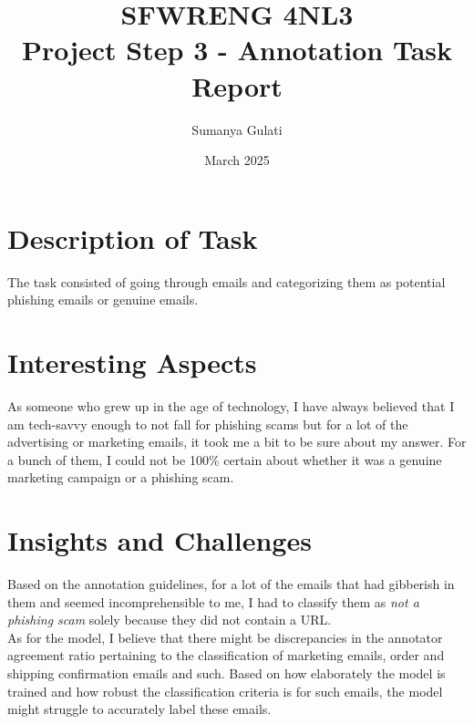 \documentclass[titlepage]{article}
\title{SFWRENG 4NL3\\ Project Step 3 - Annotation Task Report}
\author{Sumanya Gulati}
\date{March 2025}
\begin{document}
\begin{titlepage}
    \maketitle
\end{titlepage}

\newpage

\section{Description of Task}
The task consisted of going through emails and categorizing them as potential phishing emails 
or genuine emails. 

\section{Interesting Aspects}
As someone who grew up in the age of technology, I have always believed that I am tech-savvy 
enough to not fall for phishing scams but for a lot of the advertising or marketing emails, it 
took me a bit to be sure about my answer. For a bunch of them, I could not be 100\% certain 
about whether it was a genuine marketing campaign or a phishing scam.

\section{Insights and Challenges}
Based on the annotation guidelines, for a lot of the emails that had gibberish in them and seemed 
incomprehensible to me, I had to classify them as \emph{not a phishing scam} solely because they 
did not contain a URL.\\
\newline
As for the model, I believe that there might be discrepancies in the annotator agreement ratio 
pertaining to the classification of marketing emails, order and shipping confirmation emails and such. 
Based on how elaborately the model is trained and how robust the classification criteria is for such emails, 
the model might struggle to accurately label these emails.
\end{document}
